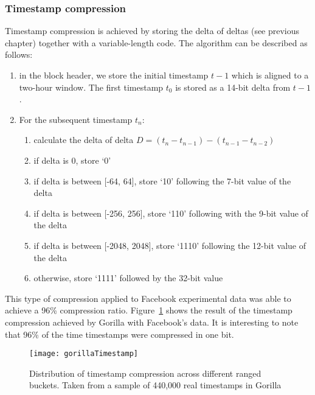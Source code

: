 \subsubsection{Timestamp compression}
Timestamp compression is achieved by storing the delta of deltas (see previous chapter)
together with a variable-length code.
The algorithm can be described as follows:
\begin{enumerate}
    \item in the block header, we store the initial timestamp $t-1$ which is aligned to a
    two-hour window. The first timestamp $t_0$ is stored as a 14-bit delta from $t-1$.
    \item For the subsequent timestamp $t_n$:
        \begin{enumerate}
            \item calculate the delta of delta $D = (t_n - t_{n-1}) - (t_{n-1} - t_{n-2})$
            \item if delta is 0, store ‘0’
            \item if delta is between [-64, 64], store ‘10’ following the 7-bit value of the
            delta
            \item if delta is between [-256, 256], store ‘110’ following with the 9-bit
            value of the delta
            \item if delta is between [-2048, 2048], store ‘1110’ following the 12-bit value
            of the delta
            \item otherwise, store ‘1111’ followed by the 32-bit value
        \end{enumerate}
\end{enumerate}
This type of compression applied to Facebook experimental data was able to achieve a 96\%
compression ratio. Figure~\ref{gorilla_timestamp} shows the result of the timestamp
compression achieved by Gorilla with Facebook’s data. It is interesting to note that
96\% of the time timestamps were compressed in one bit.

\begin{figure}[]
\begin{center}
\texttt{[image: gorillaTimestamp]}
\caption[gorilla_timestamp]{ Distribution of timestamp compression across different ranged buckets.
Taken from a sample of 440,000 real timestamps in Gorilla \cite{Pelkonen:2015}}
\label{gorilla_timestamp}
\end{center}
\end{figure}

